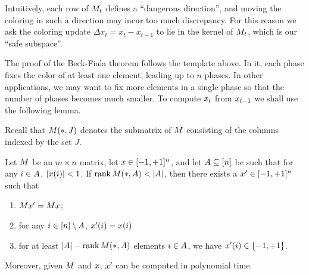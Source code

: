 Intuitively, each row of $M_t$ defines a ``dangerous direction'', and moving the coloring in such a direction may incur too much discrepancy. For this reason we ask the coloring update $\Delta x_t = x_t - x_{t-1}$ to lie in the kernel of $M_t$, which is our ``safe subspace''.  

The proof of the Beck-Fiala theorem follows the template above. In it, each phase fixes the color of at least one element, leading up to $n$ phases. In other applications, we may want to fix more elements in a single phase so that the number of phases becomes much smaller. To compute $x_t$ from $x_{t-1}$ we shall use the following lemma. 

Recall that \(M(*, J)\) denotes the submatrix of \(M\) consisting of the columns indexed by the set \(J\).

\begin{lemma}\label{lm:ch2-linalg-gen}
  Let \(M\) be an \(m \times n\) matrix, let \(x \in
  [-1,+1]^n\), and let \(A \subseteq [n]\) be such that for any \(i
  \in A\), \(|x(i)| < 1\).  If \(\operatorname{rank} M(*,A) <
  |A|\), then there exists a \(x' \in [-1,
  +1]^n\) such that
  \begin{enumerate}
  \item \(M x' = M x\);
  \item for any \(i \in [n] \setminus A\), \(x'(i) = x(i)\)
  \item for at least \(|A| - \operatorname{rank} M(*,A)\) elements 
    \(i \in A\), we have \(x'(i) \in \{-1, +1\}\).
  \end{enumerate}
  Moreover, given \(M\) and \(x\), \(x'\) can be computed in
  polynomial time.
\end{lemma}

